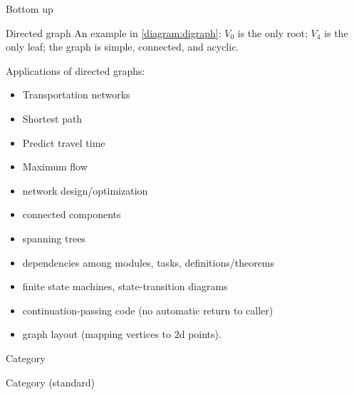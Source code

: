 \begin{plSection}{Bottom up}
\begin{plSection}{Directed graph}
An example in \cref{diagram:digraph}:
$V_0$ is the only root; $V_4$ is the only leaf;
the graph is simple, connected, and acyclic.

Applications of directed graphs:~\cite{CormenLeisersonRivestStein:2009:Algorithms}
\begin{itemize}
  \item Transportation networks
  \item Shortest path
  \item Predict travel time
  \item Maximum flow
  \item network design/optimization
  \item connected components
  \item spanning trees
  \item dependencies among modules, tasks, definitions/theorems
  \item finite state machines, state-transition diagrams
  \item continuation-passing code (no automatic return to caller)
  \item graph layout (mapping vertices to $2$d points).
\end{itemize}
\end{plSection}
\begin{plSection}{Category}
\label{sec:Category_from_digraph}

\begin{plSection}{Category (standard)}


\end{plSection}
\end{plSection}
\end{plSection}
